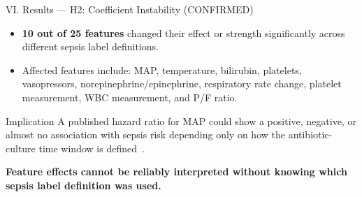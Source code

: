 \documentclass[aspectratio=169,10pt]{beamer}
\begin{document}
\begin{frame}{VI. Results --- H2: Coefficient Instability {\small\color{BabyMint!60!green}(CONFIRMED)}}
\begin{itemize}
  \item \textbf{10 out of 25 features} changed their effect or strength significantly across different sepsis label definitions.
  \item Affected features include: MAP, temperature, bilirubin, platelets, vasopressors, norepinephrine/epinephrine, respiratory rate change, platelet measurement, WBC measurement, and P/F ratio.
\end{itemize}

\vspace{6pt}
\begin{block}{Implication}
  A published hazard ratio for MAP could show a positive, negative, or almost no association with sepsis risk depending only on how the antibiotic-culture time window is defined~\cite{lauritsen2021framing}.
\end{block}

\vspace{6pt}
\textbf{Feature effects cannot be reliably interpreted without knowing which sepsis label definition was used.}
\end{frame}
\end{document}
